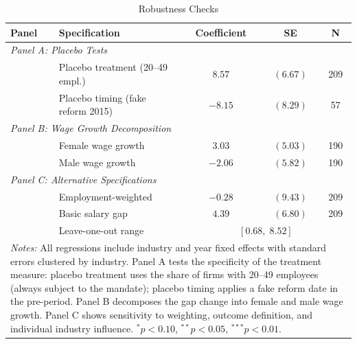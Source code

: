 \begin{table}[t]
\centering
\caption{Robustness Checks}
\label{tab:robustness}
\begin{tabular}{llccc}
\hline\hline
Panel & Specification & Coefficient & SE & N \\
\hline
\multicolumn{5}{l}{\textit{Panel A: Placebo Tests}} \\[3pt]
& Placebo treatment (20--49 empl.) & $8.57$ & $(6.67)$ & 209 \\
& Placebo timing (fake reform 2015) & $-8.15$ & $(8.29)$ & 57 \\[6pt]
\multicolumn{5}{l}{\textit{Panel B: Wage Growth Decomposition}} \\[3pt]
& Female wage growth & $3.03$ & $(5.03)$ & 190 \\
& Male wage growth & $-2.06$ & $(5.82)$ & 190 \\[6pt]
\multicolumn{5}{l}{\textit{Panel C: Alternative Specifications}} \\[3pt]
& Employment-weighted & $-0.28$ & $(9.43)$ & 209 \\
& Basic salary gap & $4.39$ & $(6.80)$ & 209 \\
& Leave-one-out range & \multicolumn{3}{c}{$[0.68, \; 8.52]$} \\
\hline\hline
\multicolumn{5}{p{0.92\textwidth}}{\footnotesize \textit{Notes:} All regressions include industry and year fixed effects with standard errors clustered by industry. Panel A tests the specificity of the treatment measure: placebo treatment uses the share of firms with 20--49 employees (always subject to the mandate); placebo timing applies a fake reform date in the pre-period. Panel B decomposes the gap change into female and male wage growth. Panel C shows sensitivity to weighting, outcome definition, and individual industry influence. $^{*}p<0.10$, $^{**}p<0.05$, $^{***}p<0.01$.} \\
\end{tabular}
\end{table}
